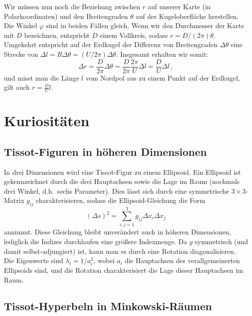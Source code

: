 Wir m\"ussen nun noch die Beziehung zwischen $r$ auf unserer Karte (in Polarkoordinaten) und den
Breitengraden $\theta$ auf der Kugeloberfl\"ache herstellen. Die Winkel $\varphi$ sind in beiden F\"allen
gleich. Wenn wir den Durchmesser der Karte mit $D$ bezeichnen, entspricht $D$ einem Vollkreis, sodass
$r= D/(2\pi) \theta$. Umgekehrt entspricht auf der Erdkugel der Differenz von Breitengraden $\Delta \theta$ eine
Strecke von $\Delta l = R \Delta \theta = (U/2\pi) \Delta \theta$. Insgesamt erhalten wir somit:
\begin{equation}
                  \Delta r = \frac{D}{2\pi} \Delta \theta = \frac{D}{2\pi} \frac{2\pi}{U} \Delta l = \frac{D}{U} \Delta l \, , 
\end{equation}  
und misst man die L\"ange $l$ vom Nordpol aus zu einem Punkt auf der Erdkugel, gilt auch
$r=\frac{D}{U} l$. 

\section{Kuriosit\"aten}

\subsection{Tissot-Figuren in h\"oheren Dimensionen}

In drei Dimensionen wird eine 
Tissot-Figur zu einem Ellipsoid. Ein Ellipsoid ist gekennzeichnet durch
die drei Hauptachsen sowie die Lage im Raum (nochmals drei Winkel, d.h.\ sechs Parameter). Dies
l\"asst sich durch eine symmetrische $3\times 3$-Matrix $g_{ij}$ charakterisieren, sodass die Ellipsoid-Gleichung die Form
\begin{equation}
               (\Delta s)^2 = \sum_{i,j=1}^3 g_{ij} \Delta x_i  \Delta x_j    
\end{equation}
annimmt. Diese Gleichung bleibt unver\"andert auch in h\"oheren Dimensionen, lediglich die Indizes 
durchlaufen eine gr\"o\ss ere Indexmenge. Da $g$ symmetrisch (und damit selbst-adjungiert) ist, kann
man es durch eine Rotation diagonalisieren. Die Eigenwerte sind $\lambda_i=1/a_i^2$, wobei $a_i$ die
Hauptachsen des verallgemeinerten Ellipsoids sind, und die Rotation charakterisiert die Lage dieser
Hauptachsen im Raum.

\subsection{Tissot-Hyperbeln in Minkowski-R\"aumen}

